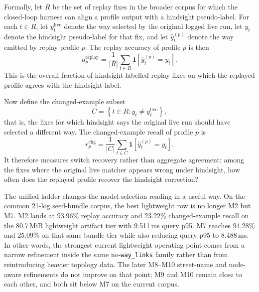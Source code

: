 \documentclass{article}
\begin{document}
Formally, let \(R\) be the set of replay fixes in the broader corpus for which the closed-loop harness can align a profile output with a hindsight pseudo-label. For each \(t \in R\), let \(y_t^{\mathrm{live}}\) denote the way selected by the original logged live run, let \(y_t\) denote the hindsight pseudo-label for that fix, and let \(\hat y_t^{(p)}\) denote the way emitted by replay profile \(p\). The replay accuracy of profile \(p\) is then
\[
a_p^{\mathrm{replay}} = \frac{1}{|R|}\sum_{t \in R}\mathbf{1}\!\left[\hat y_t^{(p)} = y_t\right].
\]
This is the overall fraction of hindsight-labelled replay fixes on which the replayed profile agrees with the hindsight label.

Now define the changed-example subset
\[
C = \left\{t \in R : y_t \neq y_t^{\mathrm{live}}\right\},
\]
that is, the fixes for which hindsight says the original live run should have selected a different way. The changed-example recall of profile \(p\) is
\[
r_p^{\mathrm{chg}} = \frac{1}{|C|}\sum_{t \in C}\mathbf{1}\!\left[\hat y_t^{(p)} = y_t\right].
\]
It therefore measures switch recovery rather than aggregate agreement: among the fixes where the original live matcher appears wrong under hindsight, how often does the replayed profile recover the hindsight correction?

\begin{table}[!htbp]
\centering
\scriptsize
\caption{Unified matcher ladder on the broader 21-log Karlsruhe seed-bundle replay corpus (\MatcherLadderCorpusFixes{} fixes; \MatcherLadderPseudoExamples{} hindsight labels). Query p95 is computed from cached per-fix \texttt{queryTimeMs} for the in-house rows and from Valhalla trace-window p95 for the oracle row. Bundle size reports the currently measured artifact tier associated with each matcher family: lightweight no-\texttt{way\_links} bundle for M2 and M6--M10, shared-topology bundle for M1, M3--M5, and M11, the full \texttt{way\_endpoints}-carrying bundle for M12, and the local Karlsruhe Valhalla tile set for the oracle.}
\label{tab:profile_comparison_expanded}
\end{table}

The unified ladder changes the model-selection reading in a useful way. On the common 21-log seed-bundle corpus, the best lightweight row is no longer M2 but M7. M2 lands at 93.96\% replay accuracy and 23.22\% changed-example recall on the 80.7\,MiB lightweight artifact tier with 9.511\,ms query p95. M7 reaches 94.28\% and 25.09\% on that same bundle tier while also reducing query p95 to 8.488\,ms. In other words, the strongest current lightweight operating point comes from a narrow refinement inside the same no-\texttt{way\_links} family rather than from reintroducing heavier topology data. The later M8--M10 street-name and node-aware refinements do not improve on that point; M9 and M10 remain close to each other, and both sit below M7 on the current corpus.
\end{document}
